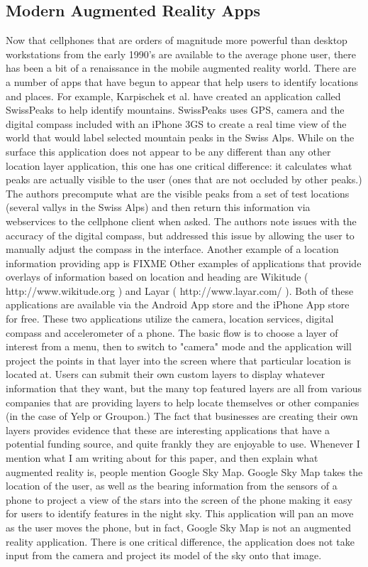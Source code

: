 \documentclass{acm_proc_article-sp}
\begin{document}
\subsection{Modern Augmented Reality Apps}
Now that cellphones that are orders of magnitude more powerful than desktop workstations from the early 1990's are available to the average phone user, there has been a bit of a renaissance in the mobile augmented reality world.  
There are a number of apps that have begun to appear that help users to identify locations and places.  For example, Karpischek et al. have created an application called SwissPeaks to help identify mountains.  SwissPeaks uses GPS, camera and the digital compass included with an iPhone 3GS to create a real time view of the world that would label selected mountain peaks in the Swiss Alps.  While on the surface this application does not appear to be any different than any other location layer application, this one has one critical difference: it calculates what peaks are actually visible to the user (ones that are not occluded by other peaks.)  The authors precompute what are the visible peaks from a set of test locations (several vallys in the Swiss Alps) and then return this information via webservices to the cellphone client when asked.  The authors note issues with the accuracy of the digital compass, but addressed this issue by allowing the user to manually adjust the compass in the interface.  \cite{karpischek2009swisspeaks}
Another example of a location information providing app is FIXME
Other examples of applications that provide overlays of information based on location and heading are Wikitude ( http://www.wikitude.org ) and Layar ( http://www.layar.com/ ).  Both of these applications are available via the Android App store and the iPhone App store for free.  These two applications utilize the camera, location services, digital compass and accelerometer of a phone.  The basic flow is to choose a layer of interest from a menu, then to switch to "camera" mode and the application will project the points in that layer into the screen where that particular location is located at.  Users can submit their own custom layers to display whatever information that they want, but the many top featured layers are all from various companies that are providing layers to help locate themselves or other companies (in the case of Yelp or Groupon.)  The fact that businesses are creating their own layers provides evidence that these are interesting applications that have a potential funding source, and quite frankly they are enjoyable to use.
Whenever I mention what I am writing about for this paper, and then explain what augmented reality is, people mention Google Sky Map.  Google Sky Map takes the location of the user, as well as the bearing information from the sensors of a phone to project a view of the stars into the screen of the phone making it easy for users to identify features in the night sky. This application will pan an move as the user moves the phone, but in fact, Google Sky Map is not an augmented reality application.  There is one critical difference, the application does not take input from the camera and project its model of the sky onto that image. \cite{Ouilhet:2010:GSM:1851600.1851695}
\end{document}
